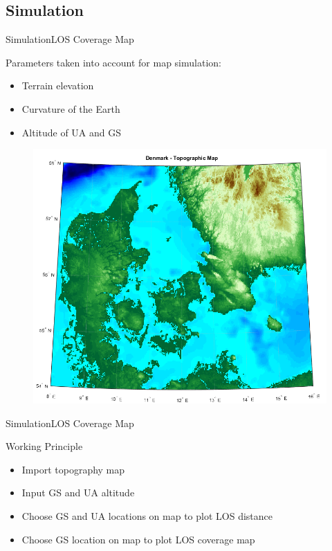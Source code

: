 \subsection{Simulation}

\begin{frame}{Simulation}{LOS Coverage Map}
  \begin{block}{Parameters taken into account for map simulation:}

	  \begin{itemize}
	  	\item Terrain elevation
	  	\item Curvature of the Earth
	  	\item Altitude of UA and GS
	  \end{itemize}

	  \begin{figure}
        \includegraphics[scale=0.26]{../report/figures/dk_map.png}
      \end{figure}
  
  \end{block}
\end{frame}

\begin{frame}{Simulation}{LOS Coverage Map}
  \begin{block}{Working Principle}
	  \begin{itemize}
	  	\item Import topography map
	  	\item Input GS and UA altitude
	  	\item Choose GS and UA locations on map to plot LOS distance
	  	\item Choose GS location on map to plot LOS coverage map
	  \end{itemize}
  \end{block}
\end{frame}

